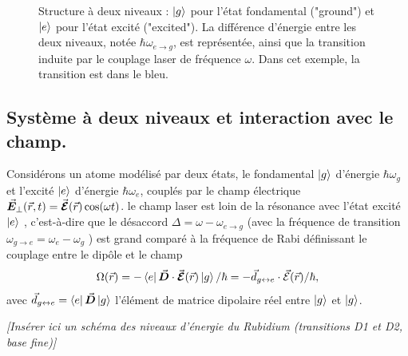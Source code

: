 \begin{figure}[!htb]
\centering
{}
\caption{Structure à deux niveaux : $\ket{g}$ pour l’état fondamental ("ground") et $\ket{e}$ pour l’état excité ("excited"). La différence d’énergie entre les deux niveaux, notée $\hbar \omega_{e \rightarrow g}$, est représentée, ainsi que la transition induite par le couplage laser de fréquence $\omega$. Dans cet exemple, la transition est dans le bleu.}

\end{figure}


\subsection{Système à deux niveaux et interaction avec le champ.}


Considérons un atome modélisé par deux états, le fondamental $\ket{g}$ d'énergie $\hbar \omega_g$  et l’excité $\ket{e}$ d'énergie $\hbar \omega_e$, couplés par le champ électrique $\vec{{\bm{E}}}_\perp(\vec{r} , t ) = \vec{{\bm{\mathcal{E}}}}(\vec{r}) \cos ( \omega t )  $. le champ laser est loin de la résonance avec l’état excité $\ket{e}$ , c’est-à-dire que le désaccord $\Delta = \omega - \omega_{e\rightarrow g}$ (avec la fréquence de transition $\omega_{g\rightarrow e} = \omega_e - \omega_g $ ) est grand comparé à la fréquence de Rabi définissant le couplage entre le dipôle et le champ 
\[\Omega(\vec{r}) = -  \bra{e} \vec{{\bm{D}}} \cdot \vec{{\bm{\mathcal{E}}}}(\vec{r}) \ket{g}/\hbar = - \vec{d}_{g\leftrightarrow e } \cdot  \vec{\mathcal{E}}(\vec{r}) /\hbar,
\] avec $\vec{d}_{g\leftrightarrow e } = \bra{e} \vec{{\bm{D}}} \ket{g} $ l’élément de matrice dipolaire réel entre $\ket{g}$ et $\ket{g}$. 

\vspace{1em}
\begin{center}
\textit{[Insérer ici un schéma des niveaux d’énergie du Rubidium (transitions D1 et D2, base fine)]}
\end{center}

